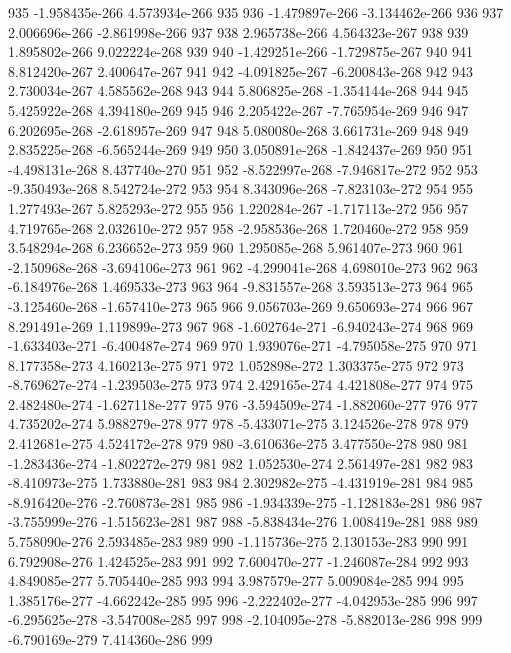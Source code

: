 \documentclass{article}
\begin{document}
\begin{Schunk}
\begin{Soutput}
935  -1.958435e-266  4.573934e-266  935
936  -1.479897e-266 -3.134462e-266  936
937   2.006696e-266 -2.861998e-266  937
938   2.965738e-266  4.564323e-267  938
939   1.895802e-266  9.022224e-268  939
940  -1.429251e-266 -1.729875e-267  940
941   8.812420e-267  2.400647e-267  941
942  -4.091825e-267 -6.200843e-268  942
943   2.730034e-267  4.585562e-268  943
944   5.806825e-268 -1.354144e-268  944
945   5.425922e-268  4.394180e-269  945
946   2.205422e-267 -7.765954e-269  946
947   6.202695e-268 -2.618957e-269  947
948   5.080080e-268  3.661731e-269  948
949   2.835225e-268 -6.565244e-269  949
950   3.050891e-268 -1.842437e-269  950
951  -4.498131e-268  8.437740e-270  951
952  -8.522997e-268 -7.946817e-272  952
953  -9.350493e-268  8.542724e-272  953
954   8.343096e-268 -7.823103e-272  954
955   1.277493e-267  5.825293e-272  955
956   1.220284e-267 -1.717113e-272  956
957   4.719765e-268  2.032610e-272  957
958  -2.958536e-268  1.720460e-272  958
959   3.548294e-268  6.236652e-273  959
960   1.295085e-268  5.961407e-273  960
961  -2.150968e-268 -3.694106e-273  961
962  -4.299041e-268  4.698010e-273  962
963  -6.184976e-268  1.469533e-273  963
964  -9.831557e-268  3.593513e-273  964
965  -3.125460e-268 -1.657410e-273  965
966   9.056703e-269  9.650693e-274  966
967   8.291491e-269  1.119899e-273  967
968  -1.602764e-271 -6.940243e-274  968
969  -1.633403e-271 -6.400487e-274  969
970   1.939076e-271 -4.795058e-275  970
971   8.177358e-273  4.160213e-275  971
972   1.052898e-272  1.303375e-275  972
973  -8.769627e-274 -1.239503e-275  973
974   2.429165e-274  4.421808e-277  974
975   2.482480e-274 -1.627118e-277  975
976  -3.594509e-274 -1.882060e-277  976
977   4.735202e-274  5.988279e-278  977
978  -5.433071e-275  3.124526e-278  978
979   2.412681e-275  4.524172e-278  979
980  -3.610636e-275  3.477550e-278  980
981  -1.283436e-274 -1.802272e-279  981
982   1.052530e-274  2.561497e-281  982
983  -8.410973e-275  1.733880e-281  983
984   2.302982e-275 -4.431919e-281  984
985  -8.916420e-276 -2.760873e-281  985
986  -1.934339e-275 -1.128183e-281  986
987  -3.755999e-276 -1.515623e-281  987
988  -5.838434e-276  1.008419e-281  988
989   5.758090e-276  2.593485e-283  989
990  -1.115736e-275  2.130153e-283  990
991   6.792908e-276  1.424525e-283  991
992   7.600470e-277 -1.246087e-284  992
993   4.849085e-277  5.705440e-285  993
994   3.987579e-277  5.009084e-285  994
995   1.385176e-277 -4.662242e-285  995
996  -2.222402e-277 -4.042953e-285  996
997  -6.295625e-278 -3.547008e-285  997
998  -2.104095e-278 -5.882013e-286  998
999  -6.790169e-279  7.414360e-286  999

\end{Soutput}
\end{Schunk}
\end{document}
